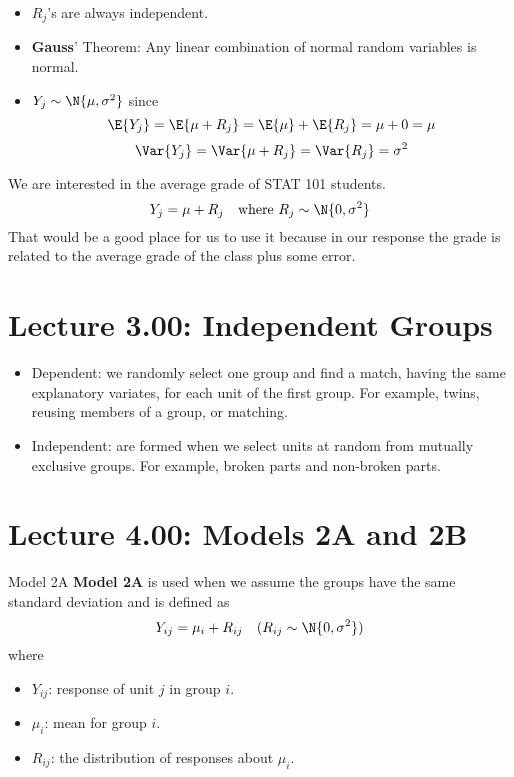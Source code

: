 \begin{Remark}{}{}
    \begin{itemize}
        \item $ R_j $'s are always independent.
        \item \textbf{Gauss}' Theorem: Any linear combination of
              normal random variables is normal.
        \item $ Y_j\sim\N{\mu,\sigma^2} $ since
              \[ \E{Y_j}=\E{\mu+R_j}=\E{\mu}+\E{R_j}=\mu+0=\mu \]
              \[ \Var{Y_j}=\Var{\mu+R_j}=\Var{R_j}=\sigma^2 \]
    \end{itemize}
\end{Remark}
\begin{Example}{}{}
    We are interested in the average grade of STAT 101 students.
    \[ Y_j=\mu+R_j\quad\text{where $R_j\sim\N{0,\sigma^2}$} \]
    That would be a good place for us to use it because in our
    response the grade is related to the average grade of the class plus some error.
\end{Example}

\section{Lecture 3.00: Independent Groups}
\begin{itemize}
    \item Dependent: we randomly select one group and
          find a match, having the same explanatory variates, for
          each unit of the first group. For example, twins, reusing
          members of a group, or matching.
    \item Independent: are formed when we select units at random
          from mutually exclusive groups. For example, broken parts
          and non-broken parts.
\end{itemize}

\section{Lecture 4.00: Models 2A and 2B}
\begin{Definition}{Model 2A}{}
    \textbf{Model 2A} is used when we assume
    the groups have the same standard deviation and is defined as
    \[ Y_{ij}=\mu_i+R_{ij}\quad(R_{ij}\sim\N{0,\sigma^2}) \]
    where
    \begin{itemize}
        \item $ Y_{ij} $: response of unit $ j $ in group $ i $.
        \item $ \mu_i $: mean for group $ i $.
        \item $ R_{ij} $: the distribution of responses about $ \mu_i $.
    \end{itemize}
\end{Definition}

